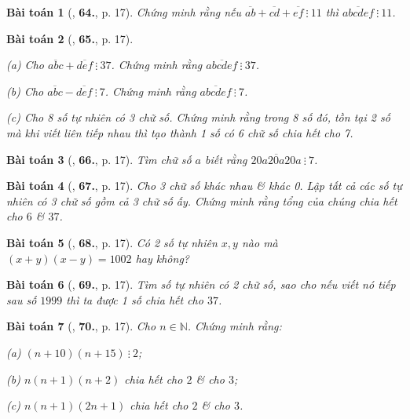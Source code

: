 \documentclass[oneside]{book}
\numberwithin{equation}{section}
\newtheorem{baitoan}{Bài toán}[section]
\begin{document}
\begin{baitoan}[\cite{Binh_Toan_6_tap_1}, \textbf{64.}, p. 17]
	Chứng minh rằng nếu $\overline{ab} + \overline{cd} + \overline{ef}\ \vdots\ 11$ thì $\overline{abcdef}\ \vdots\ 11$.
\end{baitoan}

\begin{baitoan}[\cite{Binh_Toan_6_tap_1}, \textbf{65.}, p. 17]
	\begin{enumerate*}
		\item[(a)] Cho $\overline{abc} + \overline{def}\ \vdots\ 37$. Chứng minh rằng $\overline{abcdef}\ \vdots\ 37$.
		\item[(b)] Cho $\overline{abc} - \overline{def}\ \vdots\ 7$. Chứng minh rằng $\overline{abcdef}\ \vdots\ 7$.
		\item[(c)] Cho 8 số tự nhiên có 3 chữ số. Chứng minh rằng trong 8 số đó, tồn tại 2 số mà khi viết liên tiếp nhau thì tạo thành 1 số có 6 chữ số chia hết cho 7.
	\end{enumerate*}
\end{baitoan}

\begin{baitoan}[\cite{Binh_Toan_6_tap_1}, \textbf{66.}, p. 17]
	Tìm chữ số $a$ biết rằng $\overline{20a20a20a}\ \vdots\ 7$.
\end{baitoan}

\begin{baitoan}[\cite{Binh_Toan_6_tap_1}, \textbf{67.}, p. 17]
	Cho 3 chữ số khác nhau \& khác 0. Lập tất cả các số tự nhiên có 3 chữ số gồm cả 3 chữ số ấy. Chứng minh rằng tổng của chúng chia hết cho $6$ \& $37$.
\end{baitoan}

\begin{baitoan}[\cite{Binh_Toan_6_tap_1}, \textbf{68.}, p. 17]
	Có 2 số tự nhiên $x,y$ nào mà $(x + y)(x - y) = 1002$ hay không?
\end{baitoan}

\begin{baitoan}[\cite{Binh_Toan_6_tap_1}, \textbf{69.}, p. 17]
	Tìm số tự nhiên có 2 chữ số, sao cho nếu viết nó tiếp sau số $1999$ thì ta được 1 số chia hết cho $37$.
\end{baitoan}

\begin{baitoan}[\cite{Binh_Toan_6_tap_1}, \textbf{70.}, p. 17]
	Cho $n\in\mathbb{N}$. Chứng minh rằng:
	\begin{enumerate*}
		\item[(a)] $(n + 10)(n + 15)\ \vdots\ 2$;
		\item[(b)] $n(n + 1)(n + 2)$ chia hết cho $2$ \& cho $3$;
		\item[(c)] $n(n + 1)(2n + 1)$ chia hết cho $2$ \& cho $3$. 
	\end{enumerate*}
\end{baitoan}
\end{document}
